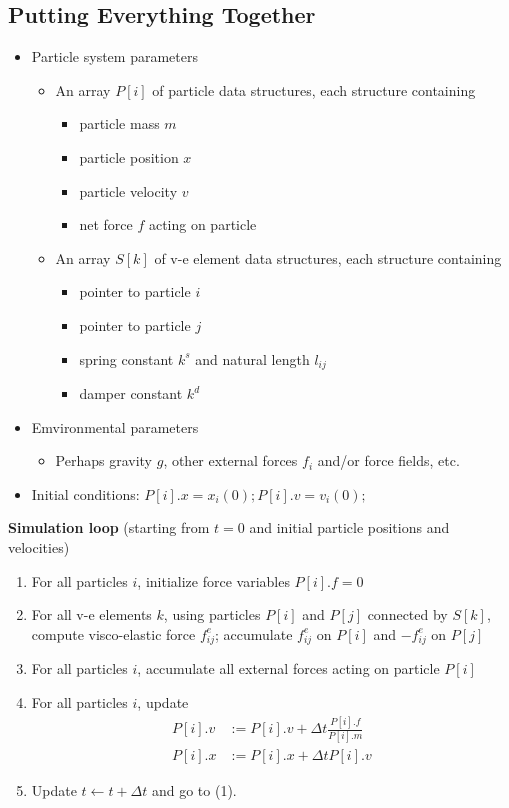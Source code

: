 \documentclass{article}
\begin{document}
\subsection*{Putting Everything Together}
\begin{itemize}
    \item Particle system parameters
    \begin{itemize}
        \item An array $P[i]$ of particle data structures, each structure containing
        \begin{itemize}
            \item particle mass $m$
            \item particle position $x$
            \item particle velocity $v$
            \item net force $f$ acting on particle
        \end{itemize}
        \item An array $S[k]$ of v-e element data structures, each structure containing
        \begin{itemize}
            \item pointer to particle $i$
            \item pointer to particle $j$
            \item spring constant $k^s$ and natural length $l_{ij}$
            \item damper constant $k^d$
        \end{itemize}
    \end{itemize}
    \item Emvironmental parameters
    \begin{itemize}
        \item Perhaps gravity $g$, other external forces $f_i$ and/or force fields, etc.
    \end{itemize}
    \item Initial conditions: $P[i].x = x_i(0); P[i].v = v_i(0);$
\end{itemize}
\textbf{Simulation loop} (starting from $t = 0$ and initial particle positions and velocities)
\begin{enumerate}
    \item For all particles $i$, initialize force variables $P[i].f = 0$
    \item For all v-e elements $k$, using particles $P[i]$ and $P[j]$ connected by $S[k]$, compute visco-elastic force $f_{ij}^e$; accumulate $f_{ij}^e$ on $P[i]$ and $-f_{ij}^e$ on $P[j]$
    \item For all particles $i$, accumulate all external forces acting on particle $P[i]$
    \item For all particles $i$, update
    \begin{align*}
        P[i].v &:= P[i].v + \Delta t \frac{P[i].f}{P[i].m}\\
        P[i].x &:= P[i].x + \Delta t P[i].v
    \end{align*}
    \item Update $t \leftarrow t + \Delta t$ and go to (1).
\end{enumerate}
\end{document}
